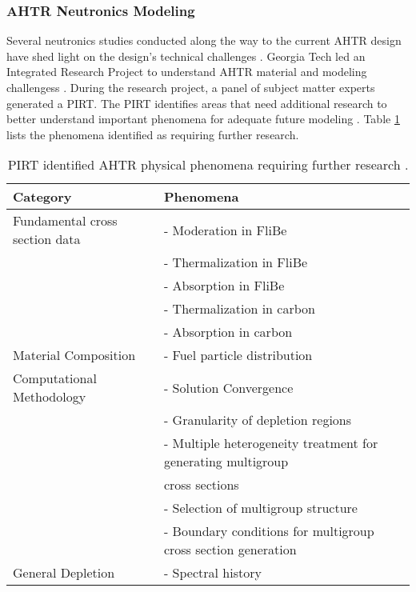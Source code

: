 \subsubsection{AHTR Neutronics Modeling}
Several neutronics studies conducted along the way to the current \gls{AHTR} 
design have shed light on the design's technical challenges 
\cite{ramey_monte_2018,holcomb_fluoride_2013,greene_pre-conceptual_2010}. 
\gls{Georgia Tech} led an Integrated Research Project to understand \gls{AHTR} 
material and modeling challengess \cite{zhang_integrated_2019}. 
During the research project, a panel of subject matter experts 
generated a \gls{PIRT}.
The \gls{PIRT} identifies areas that need additional research to better 
understand important phenomena for adequate future modeling
\cite{rahnema_phenomena_2019}. 
Table \ref{tab:phenomena} lists the phenomena identified as requiring further 
research. 
\begin{table}[btp]
    \centering
    \onehalfspacing
    \caption{\acrlong{PIRT} identified \acrlong{AHTR} physical phenomena requiring 
    further research \cite{rahnema_phenomena_2019}.}
	\label{tab:phenomena}
    \footnotesize
    \begin{tabular}{l|l}
    \hline
    \textbf{Category} & \textbf{Phenomena} \\ \hline
    Fundamental cross section data & - Moderation in FliBe \\
    & - Thermalization in FliBe \\
    & - Absorption in FliBe \\
    & - Thermalization in carbon \\
    & - Absorption in carbon \\ \hline
    Material Composition & - Fuel particle distribution \\ \hline
    Computational Methodology & - Solution Convergence \\ 
    & - Granularity of depletion regions \\
    & - Multiple heterogeneity treatment for generating multigroup \\ 
    & cross sections \\
    & - Selection of multigroup structure \\
    & - Boundary conditions for multigroup cross section generation \\ \hline 
    General Depletion & - Spectral history \\ \hline 
    \end{tabular}
\end{table}

